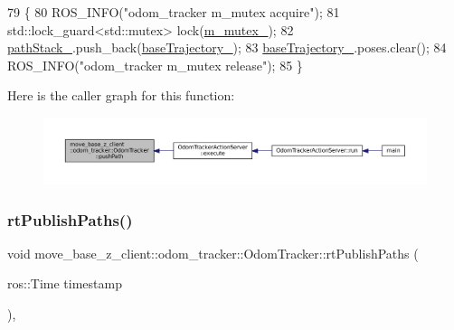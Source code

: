 \begin{DoxyCode}
79 \{
80     ROS\_INFO(\textcolor{stringliteral}{"odom\_tracker m\_mutex acquire"});
81     std::lock\_guard<std::mutex> lock(\hyperlink{classmove__base__z__client_1_1odom__tracker_1_1OdomTracker_a63676e03be48b18ac48d5e2f11f19a25}{m\_mutex\_});
82     \hyperlink{classmove__base__z__client_1_1odom__tracker_1_1OdomTracker_abb14ccfc0c5273714a5279baa07dfd11}{pathStack\_}.push\_back(\hyperlink{classmove__base__z__client_1_1odom__tracker_1_1OdomTracker_a83fa5a9bfe0b2683eee33444d3f030ea}{baseTrajectory\_});
83     \hyperlink{classmove__base__z__client_1_1odom__tracker_1_1OdomTracker_a83fa5a9bfe0b2683eee33444d3f030ea}{baseTrajectory\_}.poses.clear();
84     ROS\_INFO(\textcolor{stringliteral}{"odom\_tracker m\_mutex release"});
85 \}
\end{DoxyCode}
Here is the caller graph for this function\+:
\nopagebreak
\begin{figure}[H]
\begin{center}
\leavevmode
\includegraphics[width=350pt]{classmove__base__z__client_1_1odom__tracker_1_1OdomTracker_a2166488c9e1cd0fb94fdd963bca80ece_icgraph}
\end{center}
\end{figure}
\mbox{\label{classmove__base__z__client_1_1odom__tracker_1_1OdomTracker_a6ee06474c7aea4423a7937c8ebc193ad}} 
\subsubsection{\texorpdfstring{rt\+Publish\+Paths()}{rtPublishPaths()}}
{\footnotesize\ttfamily void move\+\_\+base\+\_\+z\+\_\+client\+::odom\+\_\+tracker\+::\+Odom\+Tracker\+::rt\+Publish\+Paths (\begin{DoxyParamCaption}\item[{ros\+::\+Time}]{timestamp }\end{DoxyParamCaption})\hspace{0.3cm}{\ttfamily [protected]}, {\ttfamily [virtual]}}

